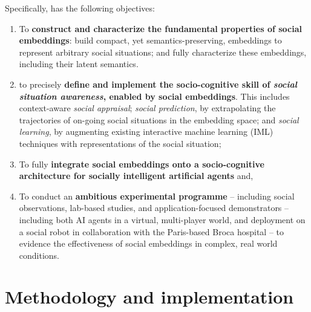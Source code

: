 \vspace{1em}

Specifically, \project has the following objectives:

\begin{enumerate}[label=\textbf{O\arabic*}]
    \item \label{O1} To \textbf{construct and characterize the fundamental
        properties of social embeddings}: build compact, yet
        semantics-preserving, embeddings to represent arbitrary social
        situations; and fully characterize these embeddings, including their
        latent semantics.

    \item \label{O2} to precisely \textbf{define and implement the socio-cognitive skill of
        \emph{social situation awareness}, enabled by social embeddings}. This
        includes context-aware \emph{social appraisal};
        \emph{social prediction}, by extrapolating the trajectories of on-going social situations in the
        embedding space; and \emph{social learning}, by augmenting existing interactive machine
        learning (IML) techniques with representations of the social situation;

    \item \label{O3} To fully {\bf integrate social embeddings onto a
        socio-cognitive architecture for socially intelligent artificial agents} and,

    \item \label{O4} To conduct an {\bf ambitious experimental programme} --
        including social observations, lab-based studies, and
        application-focused demonstrators -- including both AI agents in a
        virtual, multi-player world, and deployment on a social robot in
        collaboration with the Paris-based Broca hospital -- to evidence the
        effectiveness of social embeddings in complex, real world conditions.

\end{enumerate}


%



\section{Methodology and implementation}

